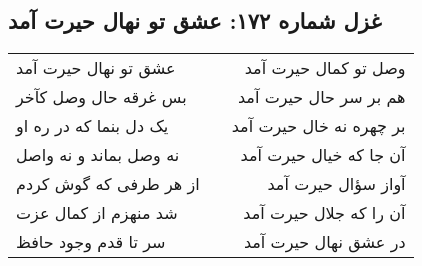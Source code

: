 \begin{center}
\section*{غزل شماره ۱۷۲: عشق تو نهال حیرت آمد}
\label{sec:sh172}
\begin{longtable}{l p{0.5cm} r}
عشق تو نهال حیرت آمد
&&
وصل تو کمال حیرت آمد
\\
بس غرقه حال وصل کآخر
&&
هم بر سر حال حیرت آمد
\\
یک دل بنما که در ره او
&&
بر چهره نه خال حیرت آمد
\\
نه وصل بماند و نه واصل
&&
آن جا که خیال حیرت آمد
\\
از هر طرفی که گوش کردم
&&
آواز سؤال حیرت آمد
\\
شد منهزم از کمال عزت
&&
آن را که جلال حیرت آمد
\\
سر تا قدم وجود حافظ
&&
در عشق نهال حیرت آمد
\\
\end{longtable}
\end{center}
